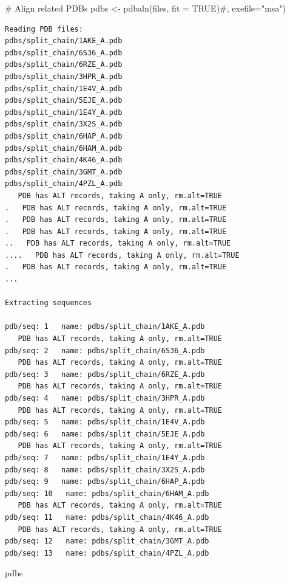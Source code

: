 \documentclass[
  letterpaper,
  DIV=11,
  numbers=noendperiod]{scrartcl}
\newenvironment{Shaded}{\begin{snugshade}}{\end{snugshade}}
\newcommand{\AttributeTok}[1]{\textcolor[rgb]{0.40,0.45,0.13}{#1}}
\newcommand{\CommentTok}[1]{\textcolor[rgb]{0.37,0.37,0.37}{#1}}
\newcommand{\ConstantTok}[1]{\textcolor[rgb]{0.56,0.35,0.01}{#1}}
\newcommand{\FunctionTok}[1]{\textcolor[rgb]{0.28,0.35,0.67}{#1}}
\newcommand{\NormalTok}[1]{\textcolor[rgb]{0.00,0.23,0.31}{#1}}
\newcommand{\OtherTok}[1]{\textcolor[rgb]{0.00,0.23,0.31}{#1}}
\begin{document}
\begin{Shaded}
\begin{Highlighting}[]
\CommentTok{\# Align related PDBs}
\NormalTok{pdbs }\OtherTok{\textless{}{-}} \FunctionTok{pdbaln}\NormalTok{(files, }\AttributeTok{fit =} \ConstantTok{TRUE}\NormalTok{)}\CommentTok{\#, exefile="msa")}
\end{Highlighting}
\end{Shaded}

\begin{verbatim}
Reading PDB files:
pdbs/split_chain/1AKE_A.pdb
pdbs/split_chain/6S36_A.pdb
pdbs/split_chain/6RZE_A.pdb
pdbs/split_chain/3HPR_A.pdb
pdbs/split_chain/1E4V_A.pdb
pdbs/split_chain/5EJE_A.pdb
pdbs/split_chain/1E4Y_A.pdb
pdbs/split_chain/3X2S_A.pdb
pdbs/split_chain/6HAP_A.pdb
pdbs/split_chain/6HAM_A.pdb
pdbs/split_chain/4K46_A.pdb
pdbs/split_chain/3GMT_A.pdb
pdbs/split_chain/4PZL_A.pdb
   PDB has ALT records, taking A only, rm.alt=TRUE
.   PDB has ALT records, taking A only, rm.alt=TRUE
.   PDB has ALT records, taking A only, rm.alt=TRUE
.   PDB has ALT records, taking A only, rm.alt=TRUE
..   PDB has ALT records, taking A only, rm.alt=TRUE
....   PDB has ALT records, taking A only, rm.alt=TRUE
.   PDB has ALT records, taking A only, rm.alt=TRUE
...

Extracting sequences

pdb/seq: 1   name: pdbs/split_chain/1AKE_A.pdb 
   PDB has ALT records, taking A only, rm.alt=TRUE
pdb/seq: 2   name: pdbs/split_chain/6S36_A.pdb 
   PDB has ALT records, taking A only, rm.alt=TRUE
pdb/seq: 3   name: pdbs/split_chain/6RZE_A.pdb 
   PDB has ALT records, taking A only, rm.alt=TRUE
pdb/seq: 4   name: pdbs/split_chain/3HPR_A.pdb 
   PDB has ALT records, taking A only, rm.alt=TRUE
pdb/seq: 5   name: pdbs/split_chain/1E4V_A.pdb 
pdb/seq: 6   name: pdbs/split_chain/5EJE_A.pdb 
   PDB has ALT records, taking A only, rm.alt=TRUE
pdb/seq: 7   name: pdbs/split_chain/1E4Y_A.pdb 
pdb/seq: 8   name: pdbs/split_chain/3X2S_A.pdb 
pdb/seq: 9   name: pdbs/split_chain/6HAP_A.pdb 
pdb/seq: 10   name: pdbs/split_chain/6HAM_A.pdb 
   PDB has ALT records, taking A only, rm.alt=TRUE
pdb/seq: 11   name: pdbs/split_chain/4K46_A.pdb 
   PDB has ALT records, taking A only, rm.alt=TRUE
pdb/seq: 12   name: pdbs/split_chain/3GMT_A.pdb 
pdb/seq: 13   name: pdbs/split_chain/4PZL_A.pdb 
\end{verbatim}

\begin{Shaded}
\begin{Highlighting}[]
\NormalTok{pdbs}
\end{Highlighting}
\end{Shaded}
\end{document}
